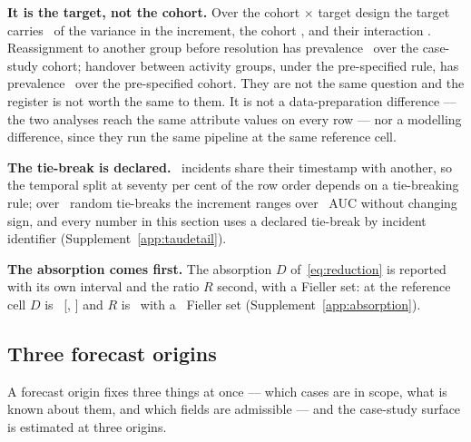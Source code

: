\textbf{It is the target, not the cohort.} Over the cohort $\times$ target
design the target carries \shareTargetPct\ of the variance in the increment,
the cohort \shareCohortPct, and their interaction \shareCohortTargetPct.
Reassignment to another group before resolution has prevalence
\casePrevalence\ over the case-study cohort; handover between activity
groups, under the pre-specified rule, has prevalence \prevRegisteredHandover\
over the pre-specified cohort. They are not the same question and the
register is not worth the same to them. It is not a data-preparation
difference --- the two analyses reach the same attribute values on every
row --- nor a modelling difference, since they run the same pipeline at the
same reference cell.

\textbf{The tie-break is declared.} \nTiedTimestamps\ incidents share their
timestamp with another, so the temporal split at seventy per cent of the row
order depends on a tie-breaking rule; over \nTiebreakDraws\ random
tie-breaks the increment ranges over \tiebreakRange\ AUC without changing
sign, and every number in this section uses a declared tie-break by incident
identifier (Supplement~\ref{app:taudetail}).

\label{sec:absorption}
\textbf{The absorption comes first.} The absorption $D$
of~\eqref{eq:reduction} is reported with its own interval and the ratio $R$
second, with a Fieller set: at the reference cell $D$ is \Dabs\ [\DabsLo,
\DabsHi] and $R$ is \Rref\ with a \RrefKind\ Fieller set
(Supplement~\ref{app:absorption}).

\subsection{Three forecast origins}
\label{sec:twodecision}

A forecast origin fixes three things at once --- which cases are in scope,
what is known about them, and which fields are admissible --- and the
case-study surface is estimated at three origins.




